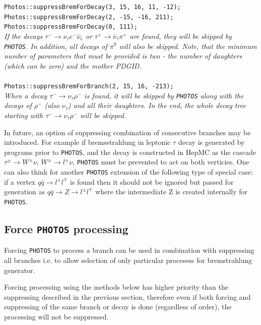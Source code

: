 \documentclass[]{Photos_interface_design}
\begin{document}
\begin{itemize}
{\tt Photos::suppressBremForDecay(3, 15, 16, 11, -12); } \\
{\tt Photos::suppressBremForDecay(2, -15, -16, 211); } \\
{\tt Photos::suppressBremForDecay(0, 111); } \\
\emph{If the decays $\tau^- \rightarrow \nu_\tau e^- \bar \nu_e$ or
      $\tau^+ \rightarrow \bar \nu_\tau \pi^+$ are found, they will be skipped by {\tt PHOTOS}.
	  In addition, all decays of $\pi^0$ will also be skipped. Note, that the minimum
	  number of parameters that must be provided is two - the number of daughters
	  (which can be zero) and the mother PDGID.} \\ \\
{\tt Photos::suppressBremForBranch(2, 15, 16, -213); } \\
\emph{When a decay $\tau^- \rightarrow \nu_\tau \rho^-$ is found, it will be skipped by
      {\tt PHOTOS} along with the decays of   $\rho^-$ 
(also $\nu_\tau$) and all
	  their daughters. In the end, the whole decay tree starting with
	  $\tau^- \rightarrow \nu_\tau \rho^-$ will be skipped.}
\end{itemize}

In future, an option of suppressing combination of consecutive branches may be introduced.
For example if bremsstrahlung in leptonic $\tau$ decay is generated by
programs prior to {\tt PHOTOS}, and the decay is constructed in HepMC as the cascade
$\tau^\pm \to W^\pm \nu$, $W^\pm \to l^\pm \nu$, {\tt PHOTOS} must
be prevented to act on both verticies.
One can also think for another {\tt PHOTOS} extension of the following type of special case: if a vertex $q
\bar q \to l^\pm l^\mp$ is found then it should not be ignored but
passed for generation as $q \bar q \to Z \to l^\pm l^\mp$ where
the intermediate Z is created internally for {\tt PHOTOS}.

\subsection{Force {\tt PHOTOS} processing }
\label{section:force}

Forcing {\tt PHOTOS} to process a branch can be used in combination with
suppressing all branches i.e. to allow selection of only particular
procesess for bremstrahlung generator.

Forcing processing using the methods below has higher priority than the suppressing described
in the previous section, therefore even if both forcing and suppressing of the same
branch or decay is done (regardless of order), the processing will not be
suppressed.
\end{document}
